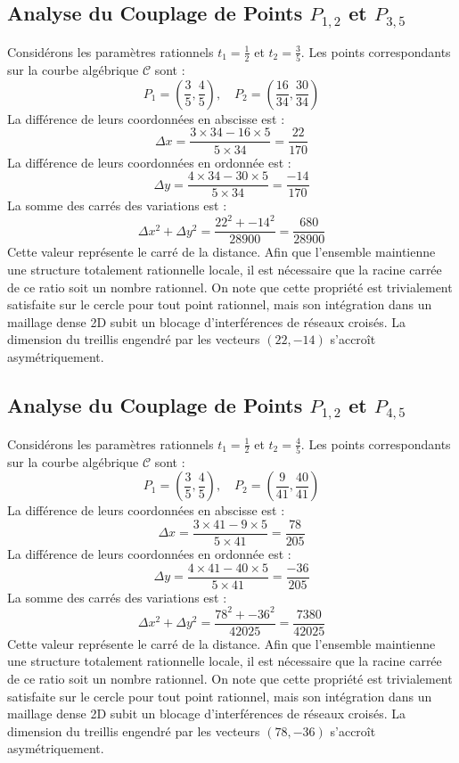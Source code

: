 \documentclass[12pt, a4paper]{article}
\begin{document}
\subsection{Analyse du Couplage de Points $P_{1,2}$ et $P_{3,5}$}
Considérons les paramètres rationnels $t_1 = \frac{1}{2}$ et $t_2 = \frac{3}{5}$.
Les points correspondants sur la courbe algébrique $\mathcal{C}$ sont :
$$ P_1 = \left( \frac{3}{5}, \frac{4}{5} \right), \quad P_2 = \left( \frac{16}{34}, \frac{30}{34} \right) $$
La différence de leurs coordonnées en abscisse est :
$$ \Delta x = \frac{3 \times 34 - 16 \times 5}{5 \times 34} = \frac{22}{170} $$
La différence de leurs coordonnées en ordonnée est :
$$ \Delta y = \frac{4 \times 34 - 30 \times 5}{5 \times 34} = \frac{-14}{170} $$
La somme des carrés des variations est :
$$ \Delta x^2 + \Delta y^2 = \frac{ 22^2 + -14^2 }{ 28900 } = \frac{ 680 }{ 28900 } $$
Cette valeur représente le carré de la distance. Afin que l'ensemble maintienne une structure totalement rationnelle locale, il est nécessaire que la racine carrée de ce ratio soit un nombre rationnel. On note que cette propriété est trivialement satisfaite sur le cercle pour tout point rationnel, mais son intégration dans un maillage dense 2D subit un blocage d'interférences de réseaux croisés. La dimension du treillis engendré par les vecteurs $( 22, -14 )$ s'accroît asymétriquement.


\subsection{Analyse du Couplage de Points $P_{1,2}$ et $P_{4,5}$}
Considérons les paramètres rationnels $t_1 = \frac{1}{2}$ et $t_2 = \frac{4}{5}$.
Les points correspondants sur la courbe algébrique $\mathcal{C}$ sont :
$$ P_1 = \left( \frac{3}{5}, \frac{4}{5} \right), \quad P_2 = \left( \frac{9}{41}, \frac{40}{41} \right) $$
La différence de leurs coordonnées en abscisse est :
$$ \Delta x = \frac{3 \times 41 - 9 \times 5}{5 \times 41} = \frac{78}{205} $$
La différence de leurs coordonnées en ordonnée est :
$$ \Delta y = \frac{4 \times 41 - 40 \times 5}{5 \times 41} = \frac{-36}{205} $$
La somme des carrés des variations est :
$$ \Delta x^2 + \Delta y^2 = \frac{ 78^2 + -36^2 }{ 42025 } = \frac{ 7380 }{ 42025 } $$
Cette valeur représente le carré de la distance. Afin que l'ensemble maintienne une structure totalement rationnelle locale, il est nécessaire que la racine carrée de ce ratio soit un nombre rationnel. On note que cette propriété est trivialement satisfaite sur le cercle pour tout point rationnel, mais son intégration dans un maillage dense 2D subit un blocage d'interférences de réseaux croisés. La dimension du treillis engendré par les vecteurs $( 78, -36 )$ s'accroît asymétriquement.
\end{document}

